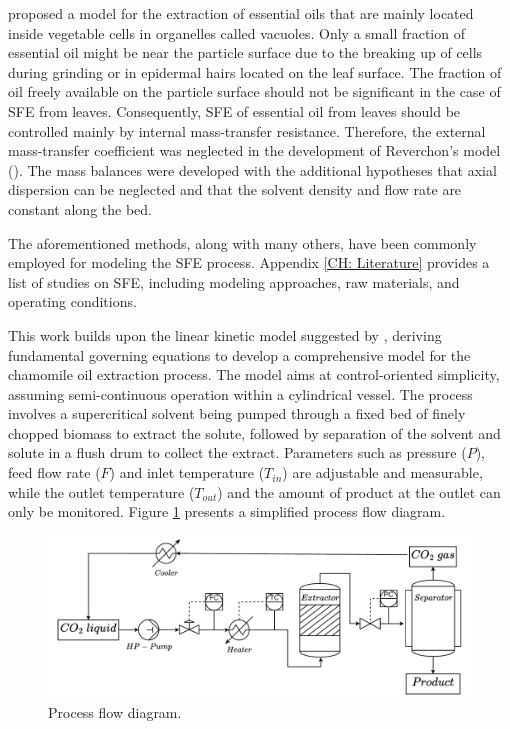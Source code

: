 \documentclass[a4paper,fleqn]{cas-dc}
\begin{document}
\citet{Reverchon1996} proposed a model for the extraction of essential oils that are mainly located inside vegetable cells in organelles called vacuoles. Only a small fraction of essential oil might be near the particle surface due to the breaking up of cells during grinding or in epidermal hairs located on the leaf surface. The fraction of oil freely available on the particle surface should not be significant in the case of SFE from leaves. Consequently, SFE of essential oil from leaves should be controlled mainly by internal mass-transfer resistance. Therefore, the external mass-transfer coefficient was neglected in the development of Reverchon's model (\citet{Reverchon1996}). The mass balances were developed with the additional hypotheses that axial dispersion can be neglected and that the solvent density and flow rate are constant along the bed.

The aforementioned methods, along with many others, have been commonly employed for modeling the SFE process. Appendix \ref{CH: Literature} provides a list of studies on SFE, including modeling approaches, raw materials, and operating conditions.

This work builds upon the linear kinetic model suggested by \citet{Reverchon1996}, deriving fundamental governing equations to develop a comprehensive model for the chamomile oil extraction process. The model aims at control-oriented simplicity, assuming semi-continuous operation within a cylindrical vessel. The process involves a supercritical solvent being pumped through a fixed bed of finely chopped biomass to extract the solute, followed by separation of the solvent and solute in a flush drum to collect the extract. Parameters such as pressure ($P$), feed flow rate ($F$) and inlet temperature ($T_{in}$) are adjustable and measurable, while the outlet temperature ($T_{out}$) and the amount of product at the outlet can only be monitored. Figure \ref{fig: SFE_drawing} presents a simplified process flow diagram.

\begin{figure}[h!]
	\centering
	\includegraphics[width=\columnwidth]{Figures/PFD.drawio.pdf}
	\caption{Process flow diagram.}
	\label{fig: SFE_drawing}
\end{figure}
\end{document}
